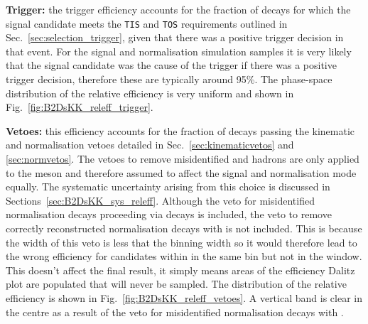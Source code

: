 \begin{description}
\item \textbf{Trigger:} the trigger efficiency accounts for the fraction of decays for which the signal candidate meets the \texttt{TIS} and \texttt{TOS} requirements outlined in Sec.~\ref{sec:selection_trigger}, given that there was a positive trigger decision in that event. For the signal and normalisation simulation samples it is very likely that the signal candidate was the cause of the trigger if there was a positive trigger decision, therefore these are typically around 95\%. The phase-space distribution of the relative efficiency is very uniform and shown in Fig.~\ref{fig:B2DsKK_releff_trigger}.
\item \textbf{Vetoes:} this efficiency accounts for the fraction of decays passing the kinematic and normalisation vetoes detailed in Sec.~\ref{sec:kinematicvetos} and \ref{sec:normvetos}. The vetoes to remove misidentified \D and \Lc hadrons are only applied to the \Dsp meson and therefore assumed to affect the signal and normalisation mode equally. The systematic uncertainty arising from this choice is discussed in Sections~\ref{sec:B2DsKK_sys_releff}. Although the veto for misidentified normalisation decays proceeding via \decay{\Dzb}{\Kp\pim} decays is included, the veto to remove correctly reconstructed normalisation decays with \decay{\Dzb}{\Kp\Km} is not included. This is because the width of this veto is less that the binning width so it would therefore lead to the wrong efficiency for candidates within in the same bin but not in the window. This doesn't affect the final result, it simply means areas of the efficiency Dalitz plot are populated that will never be sampled. The distribution of the relative efficiency is shown in Fig.~\ref{fig:B2DsKK_releff_vetoes}. A vertical band is clear in the centre as a result of the veto for misidentified normalisation decays with \decay{\Dzb}{\Kp\pim}.
\end{description}

